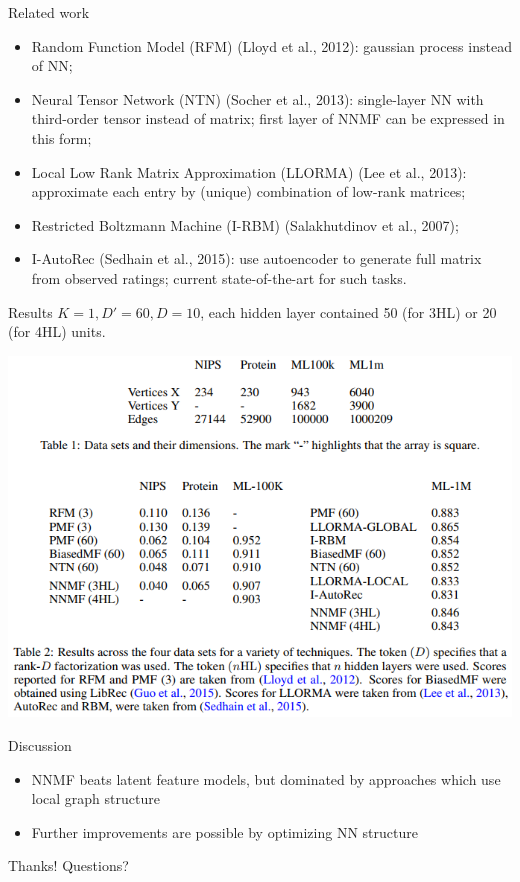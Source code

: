 \documentclass{beamer}
\begin{document}
\begin{frame}{Related work}
    \begin{itemize}
        \item Random Function Model (RFM) (Lloyd et al., 2012): gaussian process instead of NN;
        \item Neural Tensor Network (NTN) (Socher et al., 2013): single-layer NN with third-order tensor instead of matrix; first layer of NNMF can be expressed in this form;
        \item Local Low Rank Matrix Approximation (LLORMA) (Lee et al., 2013): approximate each entry by (unique) combination of low-rank matrices;
        \item Restricted Boltzmann Machine (I-RBM) (Salakhutdinov et al., 2007);
        \item I-AutoRec (Sedhain et al., 2015): use autoencoder to generate full matrix from observed ratings; current state-of-the-art for such tasks.
    \end{itemize}
\end{frame}

\begin{frame}{Results}
    $K = 1, D' = 60, D = 10$, each hidden layer contained 50 (for 3HL) or 20 (for 4HL) units.

    \center \includegraphics[width=0.8 \textwidth]{results}
\end{frame}

\begin{frame}{Discussion}
    \begin{itemize}
        \item NNMF beats latent feature models, but dominated by approaches which use local graph structure
        \item Further improvements are possible by optimizing NN structure
    \end{itemize}
\end{frame}

\begin{frame}{Thanks!}
    \center Questions?
\end{frame}
\end{document}
